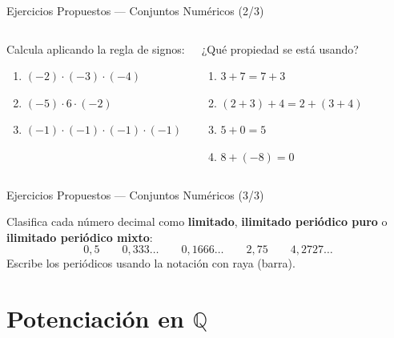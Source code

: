 \documentclass[aspectratio=169]{beamer}
\begin{document}
\begin{frame}{Ejercicios Propuestos — Conjuntos Numéricos \textnormal{(2/3)}}
  \begin{columns}[T]
    \begin{mwejercicio}
      Calcula aplicando la regla de signos:
      \begin{enumerate}
        \item $(-2)\cdot(-3)\cdot(-4)$
        \item $(-5)\cdot 6 \cdot (-2)$
        \item $(-1)\cdot(-1)\cdot(-1)\cdot(-1)$
      \end{enumerate}
    \end{mwejercicio}
    \begin{mwejercicio}
      ¿Qué propiedad se está usando?
      \begin{enumerate}
        \item $3 + 7 = 7 + 3$
        \item $(2 + 3) + 4 = 2 + (3 + 4)$
        \item $5 + 0 = 5$
        \item $8 + (-8) = 0$
      \end{enumerate}
    \end{mwejercicio}
  \end{columns}
\end{frame}

\begin{frame}{Ejercicios Propuestos — Conjuntos Numéricos \textnormal{(3/3)}}
  \begin{mwejercicio}
    Clasifica cada número decimal como \textbf{limitado},
    \textbf{ilimitado periódico puro} o \textbf{ilimitado periódico
    mixto}:
    \[
      0{,}5 \qquad 0{,}333\dots \qquad 0{,}1666\dots
      \qquad 2{,}75 \qquad 4{,}2727\dots
    \]
    Escribe los periódicos usando la notación con raya (barra).
  \end{mwejercicio}
\end{frame}

\section{Potenciación en \texorpdfstring{$\mathbb{Q}$}{Q}}
\end{document}
